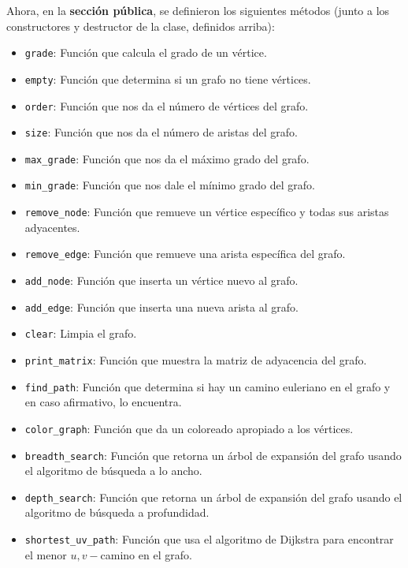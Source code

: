 \documentclass[conference]{IEEEtran}
\begin{document}
Ahora, en la \textbf{sección pública}, se definieron los siguientes métodos  (junto a los constructores y destructor de la clase, definidos arriba):

\begin{itemize}


	\item \texttt{grade}: Función que calcula el grado de un vértice.

	\item \texttt{empty}: Función que determina si un grafo no tiene vértices.

	\item \texttt{order}: Función que nos da el número de vértices del grafo.

	\item \texttt{size}: Función que nos da el número de aristas del grafo.

	\item \texttt{max\_grade}: Función que nos da el máximo grado del grafo.

	\item \texttt{min\_grade}: Función que nos dale el mínimo grado del grafo.

	\item \texttt{remove\_node}: Función que remueve un vértice específico y todas sus aristas adyacentes.

	\item \texttt{remove\_edge}: Función que remueve una arista específica del grafo.
	
	\item \texttt{add\_node}: Función que inserta un vértice nuevo al grafo.

	\item  \texttt{add\_edge}: Función que inserta una nueva arista al grafo.

	\item \texttt{clear}: Limpia el grafo.

	\item \texttt{print\_matrix}: Función que muestra la matriz de adyacencia del grafo.

	\item \texttt{find\_path}: Función que determina si hay un camino euleriano en el grafo y en caso afirmativo, lo encuentra.
	
	\item \texttt{color\_graph}: Función que da un coloreado apropiado a los vértices.
	
	\item \texttt{breadth\_search}: Función que retorna un árbol de expansión del grafo usando el algoritmo de búsqueda a lo ancho.
	
	\item \texttt{depth\_search}: Función que retorna un árbol de expansión del grafo usando el algoritmo de búsqueda a profundidad.
	
	\item \texttt{shortest\_uv\_path}: Función que usa el algoritmo de Dijkstra para encontrar el menor $u,v-$camino en el grafo.
\end{itemize}
\end{document}
